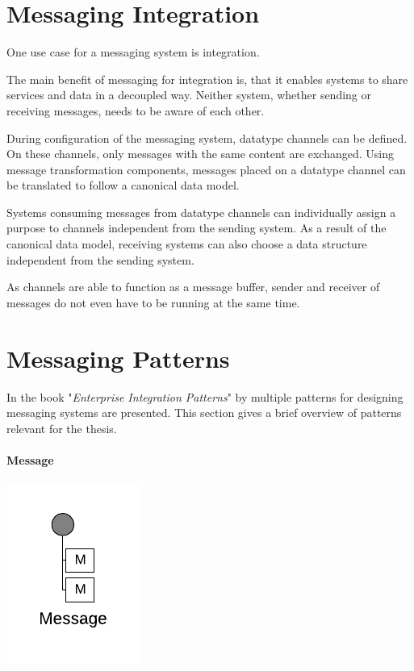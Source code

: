 \section{Messaging Integration}

One use case for a messaging system is integration.

The main benefit of messaging for integration is, that it enables systems to share services and data in a decoupled way. Neither system, whether sending or receiving messages, needs to be aware of each other. 

During configuration of the messaging system, datatype channels can be defined. On these channels, only messages with the same content are exchanged. Using message transformation components, messages placed on a datatype channel can be translated to follow a canonical data model.

Systems consuming messages from datatype channels can individually assign a purpose to channels independent from the sending system. As a result of the canonical data model, receiving systems can also choose a data structure independent from the sending system.

As channels are able to function as a message buffer, sender and receiver of messages do not even have to be running at the same time.

\section{Messaging Patterns}

In the book "\textit{Enterprise Integration Patterns}" by \cite{EIP} multiple patterns for designing messaging systems are presented. This section gives a brief overview of patterns relevant for the thesis.

\paragraph{Message}

\begin{center}
    \includegraphics[scale=0.6]{Diagrams/Messaging/1. Message.pdf}
\end{center}

